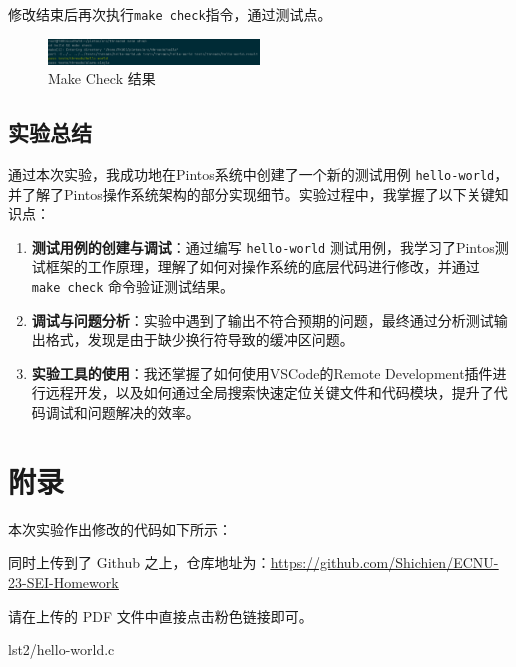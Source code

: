 修改结束后再次执行\texttt{make check}指令，通过测试点。

\begin{figure}[H]
  \centering
  \includegraphics[width=0.5\textwidth]{img2/success2.png}
  \caption{Make Check 结果}
\end{figure}

\subsection{实验总结}

通过本次实验，我成功地在Pintos系统中创建了一个新的测试用例 \texttt{hello-world}，并了解了Pintos操作系统架构的部分实现细节。实验过程中，我掌握了以下关键知识点：

\begin{enumerate}
    \item \textbf{测试用例的创建与调试}：通过编写 \texttt{hello-world} 测试用例，我学习了Pintos测试框架的工作原理，理解了如何对操作系统的底层代码进行修改，并通过 \texttt{make check} 命令验证测试结果。
    
    \item \textbf{调试与问题分析}：实验中遇到了输出不符合预期的问题，最终通过分析测试输出格式，发现是由于缺少换行符导致的缓冲区问题。
    
    \item \textbf{实验工具的使用}：我还掌握了如何使用VSCode的Remote Development插件进行远程开发，以及如何通过全局搜索快速定位关键文件和代码模块，提升了代码调试和问题解决的效率。
\end{enumerate}

\section{附录}

本次实验作出修改的代码如下所示：

同时上传到了 Github 之上，仓库地址为：\href{https://github.com/Shichien/ECNU-23-SEI-Homework/tree/main/%E6%93%8D%E4%BD%9C%E7%B3%BB%E7%BB%9F/%E5%AE%9E%E8%B7%B5%E8%AF%BE%E4%BD%9C%E4%B8%9A/Lec%202/lst2}{\underline{https://github.com/Shichien/ECNU-23-SEI-Homework}}

请在上传的 PDF 文件中直接点击粉色链接即可。

 {lst2/hello-world.c}





